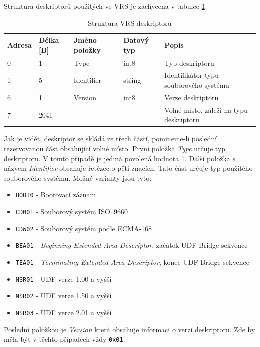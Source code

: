 Struktura deskriptorů použitých ve VRS je zachycena v tabulce \ref{tab:vrs}.

\begin{table}
    \centering
    \begin{tabular}{ | l | l | l | l | l | }
        \hline
        Adresa  & Délka [B]   & Jméno položky & Datový typ    & Popis \\ \hline\hline
        0       & 1             & Type           & int8          & Typ deskriptoru \\ \hline
        1       & 5             & Identifier & string        & Identifikátor typu souborového systému \\ \hline
        6       & 1             & Version         & int8          & Verze deskriptoru \\ \hline
        7       & 2041          & ---           & ---           & Volné místo, záleží na typu deskriptoru \\ \hline
    \end{tabular}
    \caption{Struktura VRS deskriptorů\label{tab:vrs}}
\end{table}
Jak je vidět, deskriptor se skládá ze třech částí, pomineme-li poslední rezervovanou část obsahující volné místo. První položka \textit{Type} určuje typ deskriptoru. V tomto případě je jediná povolená hodnota 1. Další položka s názvem \textit{Identifier} obsahuje řetězec o pěti znacích. Tato část určuje typ použitého souborového systému. Možné varianty jsou tyto:
\begin{itemize}
    \item \texttt{BOOT0} - Bootovací záznam
    \item \texttt{CD001} - Souborový systém ISO~9660
    \item \texttt{CDW02} - Souborový systém podle ECMA-168 \cite{ecma-168}
    \item \texttt{BEA01} - \textit{Beginning Extended Area Descriptor}, začátek UDF Bridge sekvence
    \item \texttt{TEA01} - \textit{Terminating Extended Area Descriptor}, konec UDF Bridge sekvence
    \item \texttt{NSR01} - UDF verze 1.00 a vyšší
    \item \texttt{NSR02} - UDF verze 1.50 a vyšší
    \item \texttt{NSR03} - UDF verze 2.01 a vyšší
\end{itemize}
Poslední položkou je \textit{Version} která obsahuje informaci o verzi deskriptoru. Zde by měla být v těchto případech vždy \texttt{0x01}.


